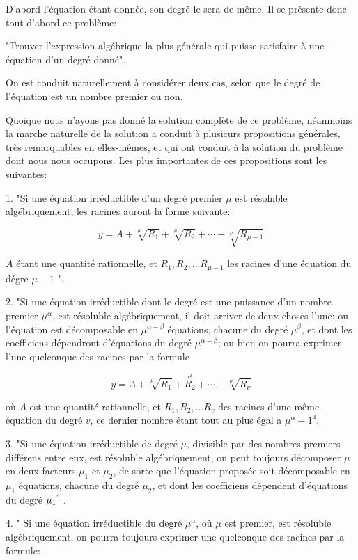 \documentclass{article}
\begin{document}
D'abord l'équation étant donnée, son degré le sera de même. Il se présente donc tout d'abord ce problème:

"Trouver l'expression algébrique la plus générale qui puisse satisfaire à une équation d'un degré donné".

On est conduit naturellement à considérer deux cas, selon que le degré de l'équation est un nombre premier ou non.

Quoique nous n'ayons pas donné la solution complète de ce problème, néanmoins la marche naturelle de la solution a conduit à plusicurs propositions générales, très remarquables en elles-mêmes, et qui ont conduit à la solution du problème dont nous nous occupons. Les plus importantes de ces propositions sont les suivantes:

1. "Si une équation irréductible d'un degré premier \(\mu\) est résolnble algébriquement, les racines auront la forme suivante:

\[
y=A+\sqrt[\mu]{R_{1}}+\sqrt[\mu]{R_{2}}+\cdots+\sqrt[\mu]{R_{\mu-1}}
\]

\(A\) étant une quantité rationnelle, et \(R_{1}, R_{2}, \ldots R_{\mu-1}\) les racines d'une équation du dégre \(\mu-1\) ".

2. "Si une équation irréductible dont le degré est une puissance d'un nombre premier \(\mu^{\alpha}\), est résoluble algébriquement, il doit arriver de deux choses l'une; ou l'équation est décomposable en \(\mu^{\alpha-\beta}\) équations, chacune du degré \(\mu^{\beta}\), et dont les coefficiens dépendront d'équations du degré \(\mu^{\alpha-\beta}\); ou bien on pourra exprimer l'une quelconque des racines par la formule

\[
y=A+\sqrt[\mu]{R_{1}}+\stackrel{\mu}{R_{2}}+\cdots+\sqrt[\mu]{R_{\nu}}
\]

où \(A\) est une quantité rationnelle, et \(R_{1}, R_{2}, \ldots R_{v}\) des racines d'une même équation du degré \(v\), ce dernier nombre étant tout au plus égal a \(\mu^{\alpha}-1^{4}\).

3. "Si une équation irréductible de degré \(\mu\), divisible par des nombres premiers différens entre eux, est résoluble algébriquement, on peut toujours décomposer \(\mu\) en deux facteurs \(\mu_{1}\) et \(\mu_{2}\), de sorte que l'équation proposée soit décomposable en \(\mu_{1}\) équations, chacune du degré \(\mu_{2}\), et dont les coefficiens dépendent d'équations du degré \(\mu_{1}{ }^{" .}\).

4. " \(\mathrm{Si}\) une équation irréductible du degré \(\mu^{\alpha}\), où \(\mu\) est premier, est résoluble algébriquement, on pourra toujours exprimer une quelconque des racines par la formule:
\end{document}
